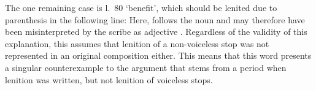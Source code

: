 The one remaining case is l.~80	 `benefit', which should be lenited due to parenthesis in the following line: 
Here,  follows the noun  and may therefore have been misinterpreted by the scribe as adjective . 
Regardless of the validity of this explanation, this assumes that lenition of a non-voiceless stop was not represented in an original composition either. 
This means that this word presents a singular counterexample to the argument that  stems from a period when lenition was written, but not lenition of voiceless stops.



